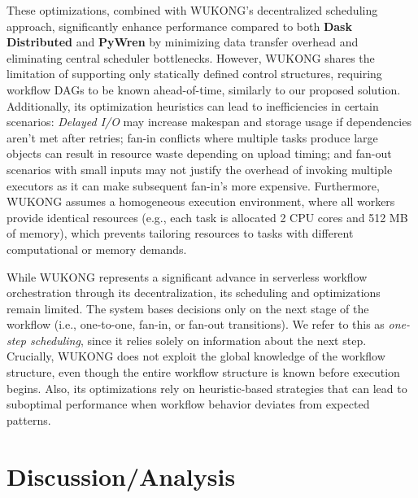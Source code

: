 \begin{itemize}
These optimizations, combined with WUKONG's decentralized scheduling approach, significantly enhance performance compared to both \textbf{Dask Distributed} and \textbf{PyWren} by minimizing data transfer overhead and eliminating central scheduler bottlenecks. However, WUKONG shares the limitation of supporting only statically defined control structures, requiring workflow DAGs to be known ahead-of-time, similarly to our proposed solution. Additionally, its optimization heuristics can lead to inefficiencies in certain scenarios: \textit{Delayed I/O} may increase makespan and storage usage if dependencies aren't met after retries; fan-in conflicts where multiple tasks produce large objects can result in resource waste depending on upload timing; and fan-out scenarios with small inputs may not justify the overhead of invoking multiple executors as it can make subsequent fan-in's more expensive. Furthermore, WUKONG assumes a homogeneous execution environment, where all workers provide identical resources (e.g., each task is allocated 2 CPU cores and 512 MB of memory), which prevents tailoring resources to tasks with different computational or memory demands.

While WUKONG represents a significant advance in serverless workflow orchestration through its decentralization, its scheduling and optimizations remain limited. The system bases decisions only on the next stage of the workflow (i.e., one-to-one, fan-in, or fan-out transitions). We refer to this as \textit{one-step scheduling}, since it relies solely on information about the next step. Crucially, WUKONG does not exploit the global knowledge of the workflow structure, even though the entire workflow structure is known before execution begins. Also, its optimizations rely on heuristic-based strategies that can lead to suboptimal performance when workflow behavior deviates from expected patterns.

\end{itemize}

\section{Discussion/Analysis}
